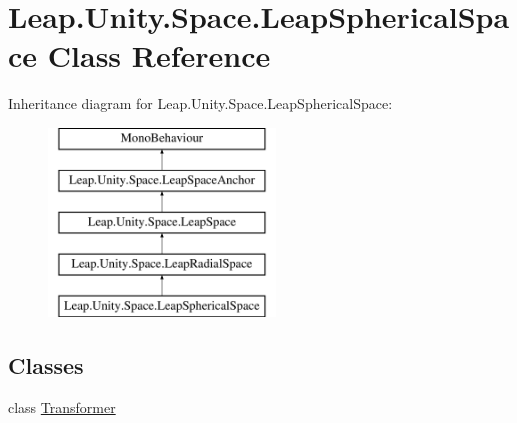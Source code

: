\hypertarget{class_leap_1_1_unity_1_1_space_1_1_leap_spherical_space}{}\section{Leap.\+Unity.\+Space.\+Leap\+Spherical\+Space Class Reference}
\label{class_leap_1_1_unity_1_1_space_1_1_leap_spherical_space}
Inheritance diagram for Leap.\+Unity.\+Space.\+Leap\+Spherical\+Space\+:\begin{figure}[H]
\begin{center}
\leavevmode
\includegraphics[height=5.000000cm]{class_leap_1_1_unity_1_1_space_1_1_leap_spherical_space}
\end{center}
\end{figure}
\subsection*{Classes}
\begin{DoxyCompactItemize}
\item 
class \mbox{\hyperlink{class_leap_1_1_unity_1_1_space_1_1_leap_spherical_space_1_1_transformer}{Transformer}}
\end{DoxyCompactItemize}
